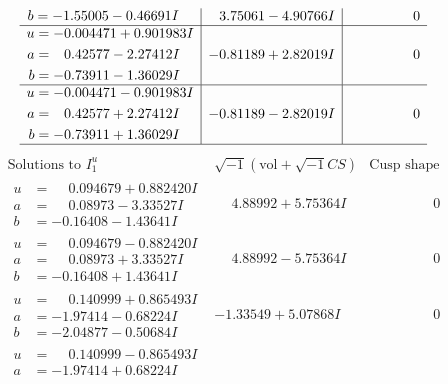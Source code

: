 \documentclass[1p]{elsarticle_modified}
\theoremstyle{definition}
\newcommand{\I}{\sqrt{-1}}
\begin{document}
$$\begin{array}{c|c|c}
\begin{aligned}
b &= -1.55005 - 0.46691 I\end{aligned}
 & \phantom{-}3.75061 - 4.90766 I & \phantom{-0.000000 } 0 \\ \hline\begin{aligned}
u &= -0.004471 + 0.901983 I \\
a &= \phantom{-}0.42577 - 2.27412 I \\
b &= -0.73911 - 1.36029 I\end{aligned}
 & -0.81189 + 2.82019 I & \phantom{-0.000000 } 0 \\ \hline\begin{aligned}
u &= -0.004471 - 0.901983 I \\
a &= \phantom{-}0.42577 + 2.27412 I \\
b &= -0.73911 + 1.36029 I\end{aligned}
 & -0.81189 - 2.82019 I & \phantom{-0.000000 } 0\\
 \hline 
 \end{array}$$\newpage$$\begin{array}{c|c|c}  
\text{Solutions to }I^u_{1}& \I (\text{vol} + \sqrt{-1}CS) & \text{Cusp shape}\\
 \hline 
\begin{aligned}
u &= \phantom{-}0.094679 + 0.882420 I \\
a &= \phantom{-}0.08973 - 3.33527 I \\
b &= -0.16408 - 1.43641 I\end{aligned}
 & \phantom{-}4.88992 + 5.75364 I & \phantom{-0.000000 } 0 \\ \hline\begin{aligned}
u &= \phantom{-}0.094679 - 0.882420 I \\
a &= \phantom{-}0.08973 + 3.33527 I \\
b &= -0.16408 + 1.43641 I\end{aligned}
 & \phantom{-}4.88992 - 5.75364 I & \phantom{-0.000000 } 0 \\ \hline\begin{aligned}
u &= \phantom{-}0.140999 + 0.865493 I \\
a &= -1.97414 - 0.68224 I \\
b &= -2.04877 - 0.50684 I\end{aligned}
 & -1.33549 + 5.07868 I & \phantom{-0.000000 } 0 \\ \hline\begin{aligned}
u &= \phantom{-}0.140999 - 0.865493 I \\
a &= -1.97414 + 0.68224 I \\

\end{aligned}
\end{array}$$
\end{document}
